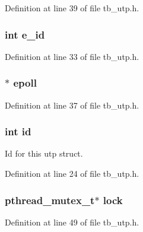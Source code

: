 Definition at line 39 of file tb\-\_\-utp.\-h.

\hypertarget{structtb__utp__t_ae2ab59af76be940892170990721a0832}{
\subsubsection[{e\-\_\-id}]{\setlength{\rightskip}{0pt plus 5cm}int e\-\_\-id}}\label{structtb__utp__t_ae2ab59af76be940892170990721a0832}


Definition at line 33 of file tb\-\_\-utp.\-h.

\hypertarget{structtb__utp__t_af7fbbda1b15f6051fb8cead0ada5ce7e}{
\subsubsection[{epoll}]{$\ast$ epoll}}\label{structtb__utp__t_af7fbbda1b15f6051fb8cead0ada5ce7e}


Definition at line 37 of file tb\-\_\-utp.\-h.

\hypertarget{structtb__utp__t_a7441ef0865bcb3db9b8064dd7375c1ea}{
\subsubsection[{id}]{\setlength{\rightskip}{0pt plus 5cm}int id}}\label{structtb__utp__t_a7441ef0865bcb3db9b8064dd7375c1ea}


Id for this utp struct. 



Definition at line 24 of file tb\-\_\-utp.\-h.

\hypertarget{structtb__utp__t_a33586b4184d23f2b8f4df153ec23af13}{
\subsubsection[{lock}]{\setlength{\rightskip}{0pt plus 5cm}pthread\-\_\-mutex\-\_\-t$\ast$ lock}}\label{structtb__utp__t_a33586b4184d23f2b8f4df153ec23af13}


Definition at line 49 of file tb\-\_\-utp.\-h.

